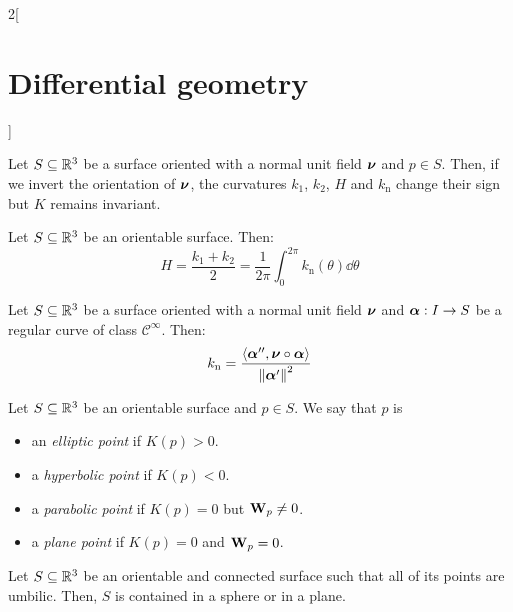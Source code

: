 \documentclass[../../../main_math.tex]{subfiles}
\begin{document}
\begin{multicols}{2}[\section{Differential geometry}]
\begin{corollary}
  \end{corollary}
  \begin{proposition}
    Let $S\subseteq\mathbb{R}^3$ be a surface oriented with a normal unit field $\boldsymbol{\mathrm{\nu}}$ and $p\in S$. Then, if we invert the orientation of $\boldsymbol{\mathrm{\nu}}$, the curvatures $k_1$, $k_2$, $H$ and $k_\text{n}$ change their sign but $K$ remains invariant.
  \end{proposition}
  \begin{proposition}
    Let $S\subseteq\mathbb{R}^3$ be an orientable surface. Then: $$H=\frac{k_1+k_2}{2}=\frac{1}{2\pi}\int_0^{2\pi}k_\text{n}(\theta)\dd\theta$$
  \end{proposition}
  \begin{proposition}
    Let $S\subseteq\mathbb{R}^3$ be a surface oriented with a normal unit field $\boldsymbol{\mathrm{\nu}}$ and $\boldsymbol{\mathrm{\alpha}}:I\rightarrow S$ be a regular curve of class $\mathcal{C}^\infty$. Then: $$k_\text{n}=\frac{\langle\boldsymbol{\mathrm{\alpha}}'',\boldsymbol{\mathrm{\nu}}\circ\boldsymbol{\mathrm{\alpha}}\rangle}{{\|\boldsymbol{\mathrm{\alpha}}'\|}^2}$$
  \end{proposition}
  \begin{definition}
    Let $S\subseteq\mathbb{R}^3$ be an orientable surface and $p\in S$. We say that $p$ is
    \begin{itemize}
      \item an \emph{elliptic point} if $K(p)>0$.
      \item a \emph{hyperbolic point} if $K(p)<0$.
      \item a \emph{parabolic point} if $K(p)=0$ but $\boldsymbol{\mathrm{W}}_p\ne0$.
      \item a \emph{plane point} if $K(p)=0$ and $\boldsymbol{\mathrm{W}}_p=0$.
    \end{itemize}
  \end{definition}
  \begin{proposition}
    Let $S\subseteq\mathbb{R}^3$ be an orientable and connected surface such that all of its points are umbilic. Then, $S$ is contained in a sphere or in a plane.
  \end{proposition}

\end{multicols}
\end{document}

